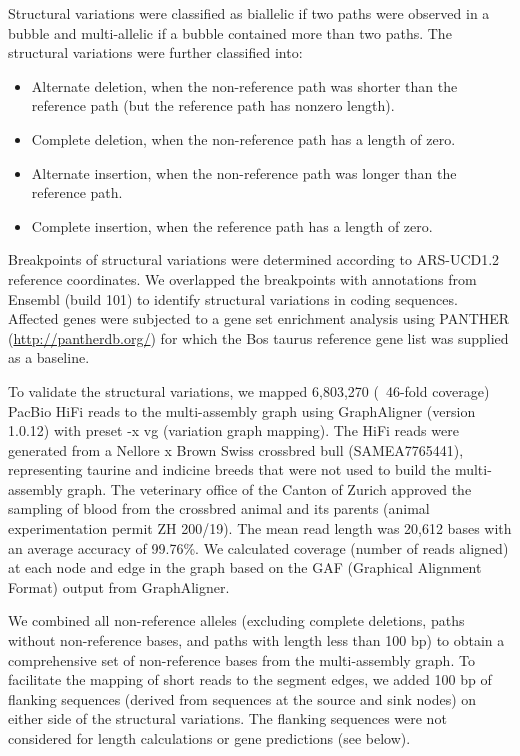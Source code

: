 \documentclass[../main.tex]{subfiles}
\begin{document}
Structural variations were classified as biallelic if two paths were observed in a bubble and multi-allelic if a bubble contained more than two paths. The structural variations were further classified into:

\begin{itemize}
    \item Alternate deletion, when the non-reference path was shorter than the reference path (but the reference path has nonzero length).
    \item Complete deletion, when the non-reference path has a length of zero.
    \item Alternate insertion, when the non-reference path was longer than the reference path.
    \item Complete insertion, when the reference path has a length of zero.
\end{itemize}

Breakpoints of structural variations were determined according to ARS-UCD1.2 reference coordinates. We overlapped the breakpoints with annotations from Ensembl (build 101) to identify structural variations in coding sequences. Affected genes were subjected to a gene set enrichment analysis using PANTHER (\url{http://pantherdb.org/}) \citep{mi2019panther} for which the Bos taurus reference gene list was supplied as a baseline. 

To validate the structural variations, we mapped 6,803,270 (~46-fold coverage) PacBio HiFi reads to the multi-assembly graph using GraphAligner (version 1.0.12) \citep{rautiainen2020graphaligner} with preset -x vg (variation graph mapping). The HiFi reads were generated from a Nellore x Brown Swiss crossbred bull (SAMEA7765441), representing taurine and indicine breeds that were not used to build the multi-assembly graph. The veterinary office of the Canton of Zurich approved the sampling of blood from the crossbred animal and its parents (animal experimentation permit ZH 200/19). The mean read length was 20,612 bases with an average accuracy of 99.76\%. We calculated coverage (number of reads aligned) at each node and edge in the graph based on the GAF (Graphical Alignment Format) output from GraphAligner.  

We combined all non-reference alleles (excluding complete deletions, paths without non-reference bases, and paths with length less than 100 bp) to obtain a comprehensive set of non-reference bases from the multi-assembly graph. To facilitate the mapping of short reads to the segment edges, we added 100 bp of flanking sequences (derived from sequences at the source and sink nodes) on either side of the structural variations. The flanking sequences were not considered for length calculations or gene predictions (see below). 
\end{document}
